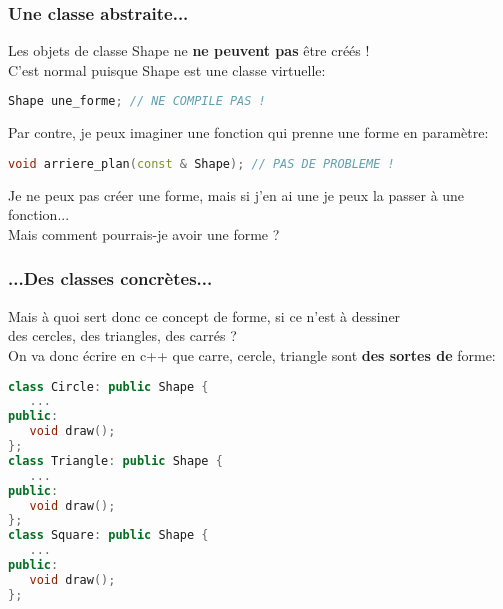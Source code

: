\documentclass{beamer}
\begin{document}
\begin{frame}[fragile=singleslide,shrink=20]
\frametitle{Une classe abstraite...}
Les objets de classe Shape ne \textbf{ne peuvent pas} être créés ! \\
C'est normal puisque Shape est une classe virtuelle: 
\begin{lstlisting}[language=c++]
Shape une_forme; // NE COMPILE PAS !
\end{lstlisting}

Par contre, je peux imaginer une fonction qui prenne une forme en paramètre:
\begin{lstlisting}[language=c++]
void arriere_plan(const & Shape); // PAS DE PROBLEME !
\end{lstlisting}
Je ne peux pas créer une forme, mais si j'en ai une je peux la passer à une fonction... \\
Mais comment pourrais-je avoir une forme ?
\end{frame}

\begin{frame}[fragile=singleslide,shrink=20]
\frametitle{...Des classes concrètes...}
Mais à quoi sert donc ce concept de forme, si ce n'est à dessiner \\ 
des cercles, des triangles, des carrés ? \\
On va donc écrire en c++ que carre, cercle, triangle sont \textbf{des sortes de} forme:

\begin{lstlisting}[language=c++]
class Circle: public Shape {
   ...
public:
   void draw();
};
class Triangle: public Shape {
   ...
public:
   void draw();
};
class Square: public Shape {
   ...
public:
   void draw();
};
\end{lstlisting}
\end{frame}
\end{document}
